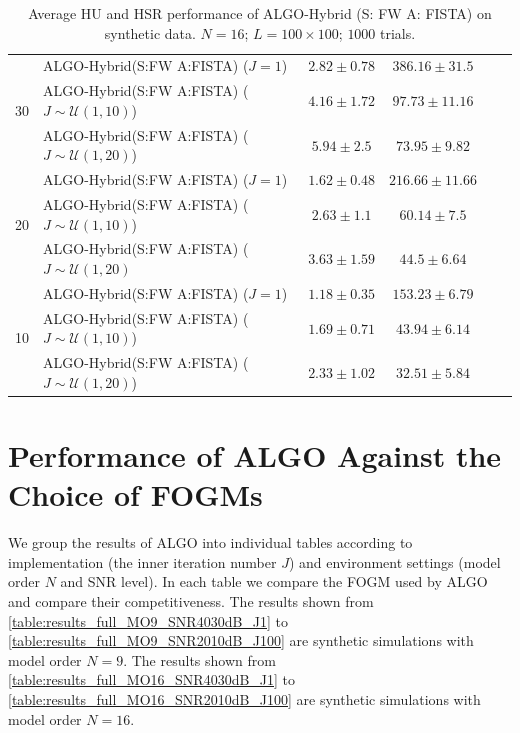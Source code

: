 \begin{table}[h]
\begin{adjustbox}{max width=\textwidth}
\begin{tabular}{|c|l|c|c|c|c|}
\multirow{3}{*}{30} & ALGO-Hybrid(S:FW A:FISTA) ($J=1$)                     & $2.82     \pm 0.78$   & $386.16   \pm 31.5$  \tabularnewline
                    & ALGO-Hybrid(S:FW A:FISTA) ($J\sim\mathcal{U}(1,10)$)  & $4.16     \pm 1.72$   & $97.73    \pm 11.16$ \tabularnewline
                    & ALGO-Hybrid(S:FW A:FISTA) ($J\sim\mathcal{U}(1,20)$)  & $5.94     \pm 2.5$    & $73.95    \pm 9.82$  \tabularnewline \cline{1-4}
\multirow{3}{*}{20} & ALGO-Hybrid(S:FW A:FISTA) ($J=1$)                     & $1.62     \pm 0.48$   & $216.66   \pm 11.66$ \tabularnewline
                    & ALGO-Hybrid(S:FW A:FISTA) ($J\sim\mathcal{U}(1,10)$)  & $2.63     \pm 1.1$    & $60.14    \pm 7.5$   \tabularnewline
                    & ALGO-Hybrid(S:FW A:FISTA) ($J\sim\mathcal{U}(1,20)$   & $3.63     \pm 1.59$   & $44.5     \pm 6.64$  \tabularnewline \cline{1-4}
\multirow{3}{*}{10} & ALGO-Hybrid(S:FW A:FISTA) ($J=1$)                     & $1.18     \pm 0.35$   & $153.23   \pm 6.79$  \tabularnewline
                    & ALGO-Hybrid(S:FW A:FISTA) ($J\sim\mathcal{U}(1,10)$)  & $1.69     \pm 0.71$   & $43.94    \pm 6.14$  \tabularnewline
                    & ALGO-Hybrid(S:FW A:FISTA) ($J\sim\mathcal{U}(1,20)$)  & $2.33     \pm 1.02$   & $32.51    \pm 5.84$  \tabularnewline \cline{1-4}
\end{tabular}
\end{adjustbox}
\caption{Average HU and HSR performance of ALGO-Hybrid (S: FW A: FISTA) on synthetic data.
         $N = 16$; $L = 100 \times 100$; $1000$ trials.}
\label{table:results_full_HYBRID_FW_FISTA_MO16}
\end{table}

\clearpage

\section{Performance of ALGO Against the Choice of FOGMs}
We group the results of ALGO into individual tables according to
implementation (the inner iteration number $J$) and environment settings
(model order $N$ and SNR level).
In each table we compare the FOGM used by ALGO and compare their
competitiveness.
The results shown from \ref{table:results_full_MO9_SNR4030dB_J1} to
\ref{table:results_full_MO9_SNR2010dB_J100} are synthetic simulations with
model order $N = 9$.
The results shown from \ref{table:results_full_MO16_SNR4030dB_J1} to
\ref{table:results_full_MO16_SNR2010dB_J100} are synthetic simulations with
model order $N = 16$.

